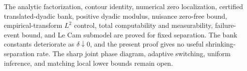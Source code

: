 The analytic factorization, contour identity, numerical zero localization, certified translated-dyadic bank, positive dyadic modulus, nuisance zero-free bound, empirical-transform \(L^2\) control, total computability and measurability, failure-event bound, and Le Cam submodel are proved for fixed separation.  The bank constants deteriorate as \(\delta\downarrow0\), and the present proof gives no useful shrinking-separation rate.  The sharp joint phase diagram, adaptive switching, uniform inference, and matching local lower bounds remain open.